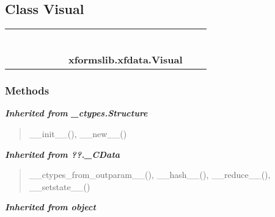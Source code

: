 \subsection{Class Visual}

    \label{xformslib:xfdata:Visual}
\begin{tabular}{cccccccccc}
\multicolumn{2}{r}{\settowidth{\BCL}{object}\multirow{2}{\BCL}{object}}
&&
&&
&&
  \\\cline{3-3}
  &&\multicolumn{1}{c|}{}
&&
&&
&&
  \\
\multicolumn{4}{r}{\settowidth{\BCL}{??.\_CData}\multirow{2}{\BCL}{??.\_CData}}
&&
&&
  \\\cline{5-5}
  &&&&\multicolumn{1}{c|}{}
&&
&&
  \\
\multicolumn{6}{r}{\settowidth{\BCL}{\_ctypes.Structure}\multirow{2}{\BCL}{\_ctypes.Structure}}
&&
  \\\cline{7-7}
  &&&&&&\multicolumn{1}{c|}{}
&&
  \\
&&&&&&\multicolumn{2}{l}{\textbf{xformslib.xfdata.Visual}}
\end{tabular}



  \subsubsection{Methods}


\large{\textbf{\textit{Inherited from \_ctypes.Structure}}}

\begin{quote}
\_\_init\_\_(), \_\_new\_\_()
\end{quote}

\large{\textbf{\textit{Inherited from ??.\_CData}}}

\begin{quote}
\_\_ctypes\_from\_outparam\_\_(), \_\_hash\_\_(), \_\_reduce\_\_(), \_\_setstate\_\_()
\end{quote}

\large{\textbf{\textit{Inherited from object}}}

